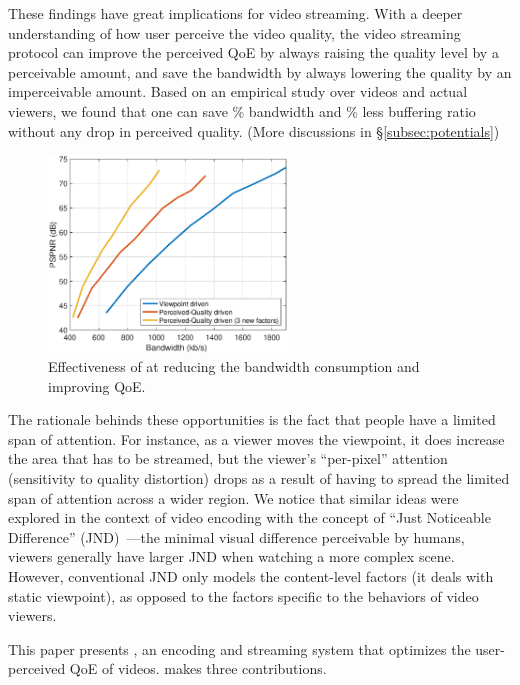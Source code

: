 These findings
have great implications for \vr video streaming. 
With a deeper understanding of how user perceive the video quality, the video streaming protocol can improve the perceived QoE by always raising the quality level by a perceivable amount, and save the bandwidth by always lowering the quality by an imperceivable amount. 
Based on an empirical study over \fillme \vr videos and \fillme actual viewers, we found that one can save \fillme\% bandwidth and \fillme\% less buffering ratio without any drop in perceived quality. (More discussions in \S\ref{subsec:potentials})



\begin{figure}[t!]
  \centering
  \includegraphics[width=2.5in]{images/improvement.eps}
  \caption{Effectiveness of \name at reducing the bandwidth consumption and improving QoE. }
  \label{fig:intro-improvement}
  \end{figure}

The rationale behinds these opportunities is the fact that people have a limited span of attention.
For instance, as a viewer moves the viewpoint, it does increase the area that has to be streamed, but the viewer's ``per-pixel'' attention  (\ie sensitivity to quality distortion) drops as a result of having to spread the limited span of attention across a wider region.
We notice that similar ideas were explored in the context of video encoding with the concept of ``Just Noticeable Difference'' (JND)~\cite{??,??,??}---the minimal visual difference perceivable by humans, \eg viewers generally have larger JND when watching a more complex scene. 
However, conventional JND only models the content-level factors (it deals with static viewpoint), as opposed to the factors specific to the behaviors of \vr video viewers. 

This paper presents {\em \name}, an encoding and streaming system that optimizes the user-perceived QoE of \vr videos.
\name makes three contributions.

